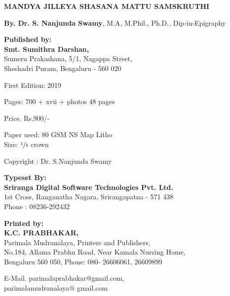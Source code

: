 \thispagestyle{empty}

\begin{center}
{\large\bf MANDYA JILLEYA SHASANA MATTU SAMSKRUTHI}

\medskip

{\bf By. Dr. S. Nanjunda Swamy}, {\fontsize{8pt}{10pt}\selectfont M.A, M.Phil., Ph.D., Dip-in-Epigraphy}


\vfil

{\bf Published by:}\\
{\bf Smt. Sumithra Darshan,}\\
Sumeru Prakashana, 5/1, Nagappa Street,\\
Sheshadri Puram, Bengaluru - 560 020

\vfil

First Edition: 2019

\vfil

Pages: 700 + xvii + photos 48 pages

\vfil

Price. Rs.900/-

\vfil

Paper used:  80 GSM NS Map Litho\\
Size:  $\sfrac{1}{4}$ crown

\vfil

Copyright : Dr. S.Nanjunda Swamy

\vfil

{\bf Typeset By:}\\[4pt]
{\bf Sriranga Digital Software Technologies Pvt. Ltd.}\\
{1st Cross, Ranganatha Nagara, Srirangapatna - 571 438}\\
{Phone : 08236-292432}

\vfil


{\bf Printed by:}\\[4pt]
{\bf K.C. PRABHAKAR,}\\
Parimala Mudranalaya, Printers and Publishers,\\
No.184, Allama Prabhu Road, Near Kamala Nursing Home,\\
Bengaluru 560 050, Phone: 080- 26606061,  26609899\\

\vfil

E-Mail.  parimalaprabhakar@gmail.com,\\
parimalamudranalaya@ gmail.com
\end{center}
